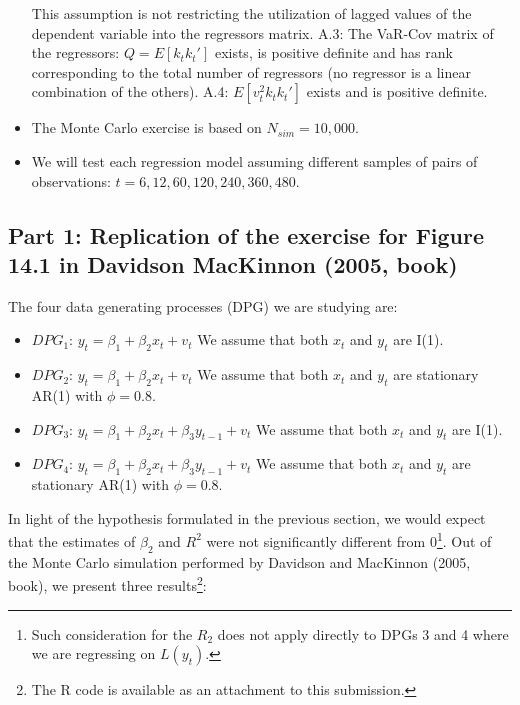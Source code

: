 \documentclass[12pt]{article}
\begin{document}
\begin{itemize}
			This assumption is not restricting the utilization of lagged values of the dependent variable into the regressors matrix.
			\subitem A.3: The VaR-Cov matrix of the regressors: $Q= E[k_{t}k_{t}']$ exists, is positive definite and has rank corresponding to the total number of regressors (no regressor is a linear combination of the others).
			\subitem A.4: $E[v_{t}^2k_{t}k_{t}']$ exists and is positive definite.
		\item The Monte Carlo exercise is based on $N_{sim} = 10,000$.
		\item We will test each regression model assuming different samples of pairs of observations: $t=6, 12, 60, 120, 240, 360, 480$.      	 	
	\end{itemize}
	\subsection{Part 1: Replication of the exercise for Figure 14.1 in Davidson MacKinnon (2005, book)}
	The four data generating processes (DPG) we are studying are:
	\begin{itemize}
	\item $DPG_1$: $y_{t} = \beta_{1} +\beta_{2}x_{t} + v_{t}$
		\subitem We assume that both $x_t$ and $y_t$ are I(1).
	\item $DPG_2$: $y_{t} = \beta_{1} +\beta_{2}x_{t} + v_{t}$
		\subitem We assume that both $x_t$ and $y_t$ are stationary AR(1) with $\phi = 0.8$.
	\item $DPG_3$: $y_{t} = \beta_{1} +\beta_{2}x_{t} + \beta_{3}y_{t-1} + v_{t}$
		\subitem We assume that both $x_t$ and $y_t$ are I(1).
	\item $DPG_4$: $y_{t} = \beta_{1} +\beta_{2}x_{t} + \beta_{3}y_{t-1} + v_{t}$
		\subitem We assume that both $x_t$ and $y_t$ are stationary AR(1) with $\phi = 0.8$. 	
	\end{itemize}	
	In light of the hypothesis formulated in the previous section, we would expect that the estimates of $\beta_{2}$ and $R^2$ were not significantly different from 0\footnote{Such consideration for the $R_2$ does not apply directly to DPGs 3 and 4 where we are regressing on $L(y_{t})$.}.
	Out of the Monte Carlo simulation performed by Davidson and MacKinnon (2005, book), we present three results\footnote{The R code is available as an attachment to this submission.}:
\end{document}
